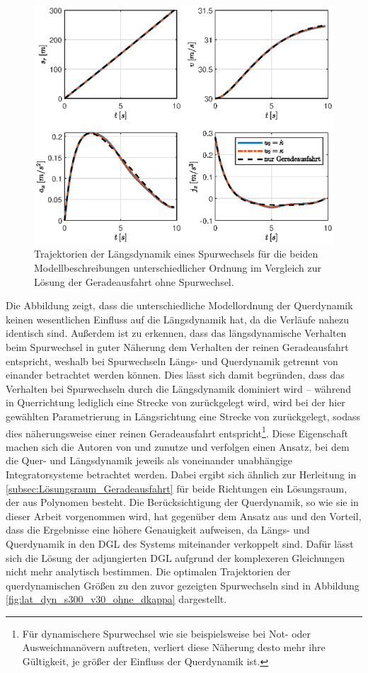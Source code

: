 \begin{figure}[h] 
	\centering
	\includegraphics[width=0.9\linewidth]{./Bilder/Ergebnisse/Geradeausfahrt/Spurwechsel/svaj_s300_v30.eps}
	\caption{Trajektorien der Längsdynamik eines Spurwechsels für die beiden Modellbeschreibungen unterschiedlicher Ordnung im Vergleich zur Lösung der Geradeausfahrt ohne Spurwechsel.}
	\label{fig:svaj_s300_v30}
\end{figure} 
Die Abbildung zeigt, dass die unterschiedliche Modellordnung der Querdynamik keinen wesentlichen Einfluss auf die Längsdynamik hat, da die Verläufe nahezu identisch sind. Außerdem ist zu erkennen, dass das längsdynamische Verhalten beim Spurwechsel in guter Näherung dem Verhalten der reinen Geradeausfahrt entspricht, weshalb bei Spurwechseln Längs- und Querdynamik getrennt von einander betrachtet werden können. Dies lässt sich damit begründen, dass das Verhalten bei Spurwechseln durch die Längsdynamik dominiert wird -- während in Querrichtung lediglich eine Strecke von  zurückgelegt wird, wird bei der hier gewählten Parametrierung in Längsrichtung eine Strecke von  zurückgelegt, sodass dies näherungsweise einer reinen Geradeausfahrt entspricht\footnote{Für dynamischere Spurwechsel wie sie beispielsweise bei Not- oder Ausweichmanövern auftreten, verliert diese Näherung desto mehr ihre Gültigkeit, je größer der Einfluss der Querdynamik ist.}. Diese Eigenschaft machen sich die Autoren von \cite{Rathgeber.2016} und \cite{Werling.2011} zunutze und verfolgen einen Ansatz, bei dem die Quer- und Längsdynamik jeweils als voneinander unabhängige Integratorsysteme betrachtet werden. Dabei ergibt sich ähnlich zur Herleitung in \ref{subsec:Lösungsraum_Geradeausfahrt} für beide Richtungen ein Lösungsraum, der aus Polynomen besteht. Die Berücksichtigung der Querdynamik, so wie sie in dieser Arbeit vorgenommen wird, hat gegenüber dem Ansatz aus \cite{Rathgeber.2016} und \cite{Werling.2011} den Vorteil, dass die Ergebnisse eine höhere Genauigkeit aufweisen, da Längs- und Querdynamik in den \gls{DGL} des Systems miteinander verkoppelt sind. Dafür lässt sich die Lösung der adjungierten \gls{DGL} aufgrund der komplexeren Gleichungen nicht mehr analytisch bestimmen. Die optimalen Trajektorien der querdynamischen Größen zu den zuvor gezeigten Spurwechseln sind in Abbildung \ref{fig:lat_dyn_s300_v30_ohne_dkappa} dargestellt.
